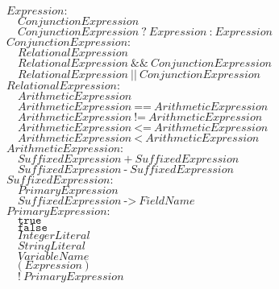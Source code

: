 \documentclass{article}
\begin{document}
\begin{flushleft}
$\mathit{Expression{:}}$\\
$\quad \mathit{ConjunctionExpression}$\\
$\quad \mathit{ConjunctionExpression}\ \texttt{?}\ \mathit{Expression}\ \texttt{:}\ \mathit{Expression}$\\[5pt]

$\mathit{ConjunctionExpression{:}}$\\
$\quad \mathit{RelationalExpression}$\\
$\quad \mathit{RelationalExpression}\ \texttt{\&\&}\ \mathit{ConjunctionExpression}$\\
$\quad \mathit{RelationalExpression}\ \texttt{||}\ \mathit{ConjunctionExpression}$\\[5pt]

$\mathit{RelationalExpression{:}}$\\
$\quad \mathit{ArithmeticExpression}$\\
$\quad \mathit{ArithmeticExpression}\ \texttt{==}\ \mathit{ArithmeticExpression}$\\
$\quad \mathit{ArithmeticExpression}\ \texttt{!=}\ \mathit{ArithmeticExpression}$\\
$\quad \mathit{ArithmeticExpression}\ \texttt{<=}\ \mathit{ArithmeticExpression}$\\
$\quad \mathit{ArithmeticExpression}\ \texttt{<}\ \mathit{ArithmeticExpression}$\\[5pt]

$\mathit{ArithmeticExpression{:}}$\\
$\quad \mathit{SuffixedExpression}\ \texttt{+}\ \mathit{SuffixedExpression}$\\
$\quad \mathit{SuffixedExpression}\ \texttt{-}\ \mathit{SuffixedExpression}$\\[5pt]

$\mathit{SuffixedExpression{:}}$\\
$\quad \mathit{PrimaryExpression}$\\
$\quad \mathit{SuffixedExpression}\ \texttt{->}\ \mathit{FieldName}$\\[5pt]

$\mathit{PrimaryExpression{:}}$\\
$\quad \texttt{true}$\\
$\quad \texttt{false}$\\
$\quad \mathit{IntegerLiteral}$\\
$\quad \mathit{StringLiteral}$\\
$\quad \mathit{VariableName}$\\
$\quad \texttt{(}\ \mathit{Expression}\ \texttt{)}$\\
$\quad \texttt{!}\ \mathit{PrimaryExpression}$\\
\end{flushleft}
\end{document}
